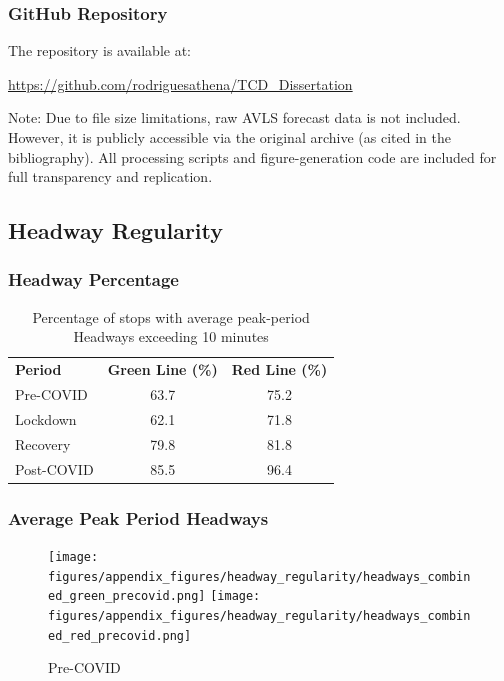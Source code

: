 \vspace{1em}
\subsubsection*{GitHub Repository}

The repository is available at:

\url{https://github.com/rodriguesathena/TCD_Dissertation}

Note: Due to file size limitations, raw AVLS forecast data is not included. However, it is publicly accessible via the original archive (as cited in the bibliography). All processing scripts and figure-generation code are included for full transparency and replication.

\newpage
\subsection*{Headway Regularity}

\subsubsection*{Headway Percentage}
\begin{table}[H]
  \centering
  \caption{Percentage of stops with average peak-period Headways exceeding 10 minutes}
  \label{tab:headway_summary}
  \begin{tabular}{lcc}
    \textbf{Period} & \textbf{Green Line (\%)} & \textbf{Red Line (\%)} \\
    Pre-COVID & 63.7 & 75.2 \\
    Lockdown  & 62.1 & 71.8 \\
    Recovery  & 79.8 & 81.8 \\
    Post-COVID & 85.5 & 96.4 \\
  \end{tabular}
\end{table}

\subsubsection*{Average Peak Period Headways}

\begin{figure}[H]
  \centering
  \texttt{[image: figures/appendix\_figures/headway\_regularity/headways\_combined\_green\_precovid.png]}
  \texttt{[image: figures/appendix\_figures/headway\_regularity/headways\_combined\_red\_precovid.png]}
  \caption{Pre-COVID}
\end{figure}

